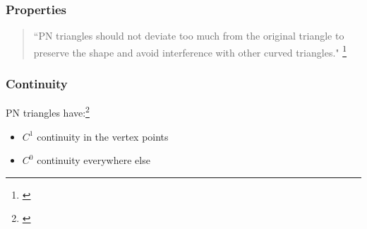

\begin{frame}\frametitle{Properties}
	\begin{quote}
		``PN triangles should not deviate too much from the original triangle to preserve the shape and avoid interference with other curved triangles."
		\footnote{\citeauthor{vlachos2001curved}}
	\end{quote}
\end{frame}

\begin{frame}\frametitle{Continuity}	
	PN triangles have:\footnote{\citeauthor{jiao2005parallel}}
	\begin{itemize}
		\item $C^1$ continuity in the vertex points
		\item $C^0$ continuity everywhere else
	\end{itemize}
\end{frame}

